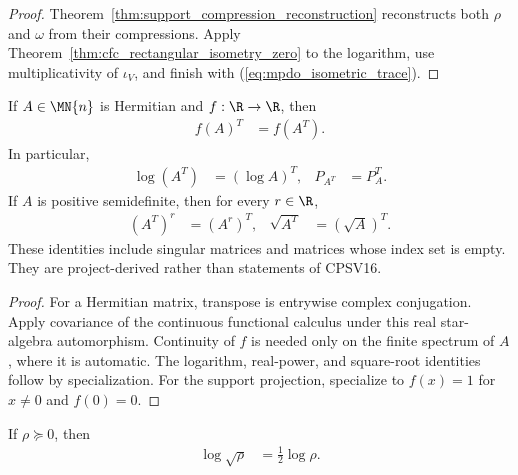 \begin{proof}\leanok
    Theorem~\ref{thm:support_compression_reconstruction} reconstructs both
    $\rho$ and $\omega$ from their compressions. Apply
    Theorem~\ref{thm:cfc_rectangular_isometry_zero} to the logarithm, use
    multiplicativity of $\iota_V$, and finish with
    (\ref{eq:mpdo_isometric_trace}).
\end{proof}

\begin{theorem}
    \label{thm:cfc_transpose_hermitian}
    \leanok
    If $A\in\MN{n}$ is Hermitian and $f:\R\to\R$, then
    \begin{align}
        f(A)^T & =f(A^T).
        \label{eq:mpdo_cfc_transpose}
    \end{align}
    In particular,
    \begin{align}
        \log(A^T) & =(\log A)^T, &
        P_{A^T}   & =P_A^T.
        \label{eq:mpdo_log_support_transpose}
    \end{align}
    If $A$ is positive semidefinite, then for every $r\in\R$,
    \begin{align}
        (A^T)^r    & =(A^r)^T,     &
        \sqrt{A^T} & =(\sqrt A)^T.
        \label{eq:mpdo_power_sqrt_transpose}
    \end{align}
    These identities include singular matrices and matrices whose index set is
    empty. They are project-derived rather than statements of CPSV16.
\end{theorem}

\begin{proof}\leanok
    For a Hermitian matrix, transpose is entrywise complex conjugation.
    Apply covariance of the continuous functional calculus under this real
    star-algebra automorphism. Continuity of $f$ is needed only on the finite
    spectrum of $A$, where it is automatic. The logarithm, real-power, and
    square-root identities follow by specialization. For the support
    projection, specialize to $f(x)=1$ for $x\neq0$ and $f(0)=0$.
\end{proof}


\begin{theorem}
    \label{thm:log_sqrt_possemidef}
    \leanok
    If $\rho\succeq0$, then
    \begin{align}
        \log\sqrt{\rho} & =\frac12\log\rho.
        \label{eq:mpdo_log_sqrt}
    \end{align}
\end{theorem}

